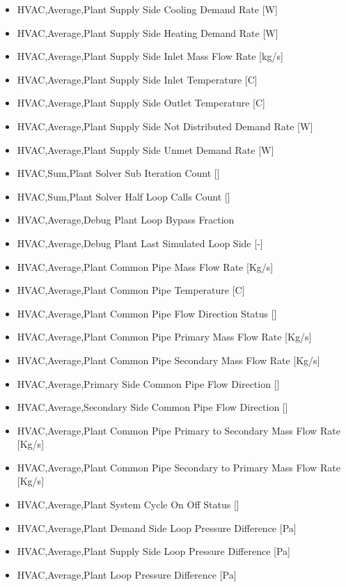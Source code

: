 \begin{itemize}
\item
  HVAC,Average,Plant Supply Side Cooling Demand Rate {[}W{]}
\item
  HVAC,Average,Plant Supply Side Heating Demand Rate {[}W{]}
\item
  HVAC,Average,Plant Supply Side Inlet Mass Flow Rate {[}kg/s{]}
\item
  HVAC,Average,Plant Supply Side Inlet Temperature {[}C{]}
\item
  HVAC,Average,Plant Supply Side Outlet Temperature {[}C{]}
\item
  HVAC,Average,Plant Supply Side Not Distributed Demand Rate {[}W{]}
\item
  HVAC,Average,Plant Supply Side Unmet Demand Rate {[}W{]}
\item
  HVAC,Sum,Plant Solver Sub Iteration Count {[]}
\item
  HVAC,Sum,Plant Solver Half Loop Calls Count {[]}
\item
  HVAC,Average,Debug Plant Loop Bypass Fraction
\item
  HVAC,Average,Debug Plant Last Simulated Loop Side {[}-{]}
\item
  HVAC,Average,Plant Common Pipe Mass Flow Rate {[}Kg/s{]}
\item
  HVAC,Average,Plant Common Pipe Temperature {[}C{]}
\item
  HVAC,Average,Plant Common Pipe Flow Direction Status {[]}
\item
  HVAC,Average,Plant Common Pipe Primary Mass Flow Rate {[}Kg/s{]}
\item
  HVAC,Average,Plant Common Pipe Secondary Mass Flow Rate {[}Kg/s{]}
\item
  HVAC,Average,Primary Side Common Pipe Flow Direction {[]}
\item
  HVAC,Average,Secondary Side Common Pipe Flow Direction {[]}
\item
  HVAC,Average,Plant Common Pipe Primary to Secondary Mass Flow Rate {[}Kg/s{]}
\item
  HVAC,Average,Plant Common Pipe Secondary to Primary Mass Flow Rate {[}Kg/s{]}
\item
  HVAC,Average,Plant System Cycle On Off Status {[]}
\item
  HVAC,Average,Plant Demand Side Loop Pressure Difference {[}Pa{]}
\item
  HVAC,Average,Plant Supply Side Loop Pressure Difference {[}Pa{]}
\item
  HVAC,Average,Plant Loop Pressure Difference {[}Pa{]}
\end{itemize}

